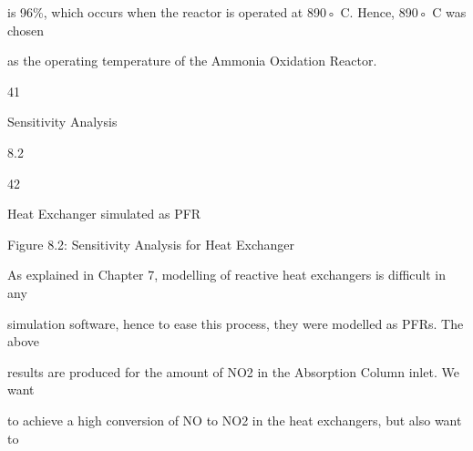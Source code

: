 \documentclass[a4paper,portrait,12pt]{article}
\begin{document}
\begin{flushleft}
is 96\%, which occurs when the reactor is operated at 890◦ C. Hence, 890◦ C was chosen
\end{flushleft}


\begin{flushleft}
as the operating temperature of the Ammonia Oxidation Reactor.
\end{flushleft}


41





\begin{flushleft}
\newpage
Sensitivity Analysis
\end{flushleft}





8.2





42





\begin{flushleft}
Heat Exchanger simulated as PFR
\end{flushleft}





\begin{flushleft}
Figure 8.2: Sensitivity Analysis for Heat Exchanger
\end{flushleft}





\begin{flushleft}
As explained in Chapter 7, modelling of reactive heat exchangers is difficult in any
\end{flushleft}


\begin{flushleft}
simulation software, hence to ease this process, they were modelled as PFRs. The above
\end{flushleft}


\begin{flushleft}
results are produced for the amount of NO2 in the Absorption Column inlet. We want
\end{flushleft}


\begin{flushleft}
to achieve a high conversion of NO to NO2 in the heat exchangers, but also want to
\end{flushleft}
\end{document}

